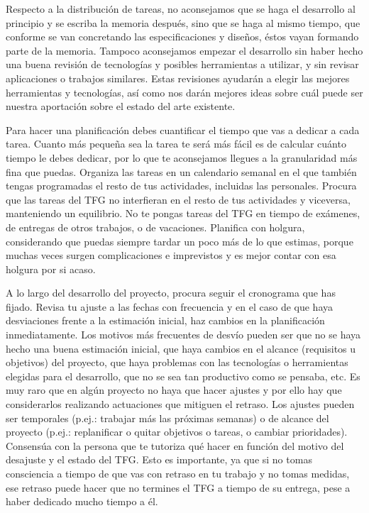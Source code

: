 {Respecto a la distribución de tareas, no aconsejamos que se haga el desarrollo al principio y se escriba la memoria después, sino que se haga al mismo tiempo, que conforme se van concretando las especificaciones y diseños, éstos vayan formando parte de la memoria. Tampoco aconsejamos empezar el desarrollo sin haber hecho una buena revisión de tecnologías y posibles herramientas a utilizar, y sin revisar aplicaciones o trabajos similares. Estas revisiones ayudarán a elegir las mejores herramientas y tecnologías, así como nos darán mejores ideas sobre cuál puede ser nuestra aportación sobre el estado del arte existente. 

Para hacer una planificación debes cuantificar el tiempo que vas a dedicar a cada tarea. Cuanto más pequeña sea la tarea te será más fácil es de calcular cuánto tiempo le debes dedicar, por lo que te aconsejamos llegues a la granularidad más fina que puedas. Organiza las tareas en un calendario semanal en el que también tengas programadas el resto de tus actividades, incluidas las personales. Procura que las tareas del TFG no interfieran en el resto de tus actividades y viceversa, manteniendo un equilibrio. No te pongas tareas del TFG en tiempo de exámenes, de entregas de otros trabajos, o de vacaciones. Planifica con holgura, considerando que puedas siempre tardar un poco más de lo que estimas, porque muchas veces surgen complicaciones e imprevistos y es mejor contar con esa holgura por si acaso.

A lo largo del desarrollo del proyecto, procura seguir el cronograma que has fijado. Revisa tu ajuste a las fechas con frecuencia y en el caso de que haya desviaciones frente a la estimación inicial, haz cambios en la planificación inmediatamente. Los motivos más frecuentes de desvío pueden ser que no se haya hecho una buena estimación inicial, que haya cambios en el alcance (requisitos u objetivos) del proyecto, que haya problemas con las tecnologías o herramientas elegidas para el desarrollo, que no se sea tan productivo como se pensaba, etc. Es muy raro que en algún proyecto no haya que hacer ajustes y por ello hay que considerarlos realizando actuaciones que mitiguen el retraso. Los ajustes pueden ser temporales (p.ej.: trabajar más las próximas semanas) o de alcance del proyecto (p.ej.: replanificar o quitar objetivos o tareas, o cambiar prioridades). Consensúa con la persona que te tutoriza qué hacer en función del motivo del desajuste y el estado del TFG. Esto es importante, ya que si no tomas consciencia a tiempo de que vas con retraso en tu trabajo y no tomas medidas, ese retraso puede hacer que no termines el TFG a tiempo de su entrega, pese a haber dedicado mucho tiempo a él. 

}
